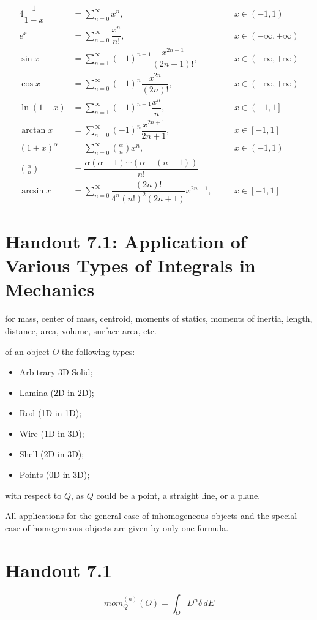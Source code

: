 \begin{alignat*}{4}
    \dfrac{1}{1-x} &= \sum_{n=0}^{\infty} x^n, \quad &&x\in (-1, 1) \\
    e^x &= \sum_{n=0}^\infty\dfrac{x^n}{n!}, &&x \in(-\infty, +\infty) \\
    \sin x &= \sum_{n=1}^\infty (-1)^{n-1} \dfrac{x^{2n-1}}{(2n-1)!}, \quad&&x \in (-\infty, +\infty) \\
    \cos x &= \sum_{n=0}^\infty (-1)^{n} \dfrac{x^{2n}}{(2n)!}, \quad&&x \in (-\infty, +\infty) \\
    \ln{(1+x)} &= \sum_{n=1}^\infty (-1)^{n-1} \dfrac{x^n}{n}, \quad&&x \in \left(-1, 1\right] \\
    \arctan x &= \sum_{n=0}^\infty (-1)^n \dfrac{x^{2n+1}}{2n+1}, \quad&&x \in [-1, 1] \\
    (1+x)^\alpha &= \sum_{n=0}^\infty \binom{\alpha}{n} x^n, \quad&&x \in (-1, 1) \\
    \binom{\alpha}{n} &= \dfrac{\alpha(\alpha-1)\cdots(\alpha-(n-1))}{n!} \\
    \arcsin x &= \sum_{n=0}^\infty \dfrac{(2n)!}{4^n(n!)^2(2n+1)}x^{2n+1}, \quad&&x \in [-1, 1]
\end{alignat*}

\pagebreak
\section*{Handout 7.1: Application of Various Types of Integrals in Mechanics}
for mass, center of mass, centroid, moments of statics, moments of inertia, length, distance, area, volume, surface area, etc.

of an object $O$ the following types:
\begin{itemize}
    \item Arbitrary 3D Solid;
    \item Lamina (2D in 2D);
    \item Rod (1D in 1D);
    \item Wire (1D in 3D);
    \item Shell (2D in 3D);
    \item Points (0D in 3D);
\end{itemize}
with respect to $Q$, as $Q$ could be a point, a straight line, or a plane.

All applications for the general case of inhomogeneous objects and the special case of homogeneous objects are given by only one formula.
\pagebreak
\section*{Handout 7.1}
\begin{equation*}
    mom_Q^{(n)}(O) = \int_O D^n \delta \, dE
\end{equation*}

